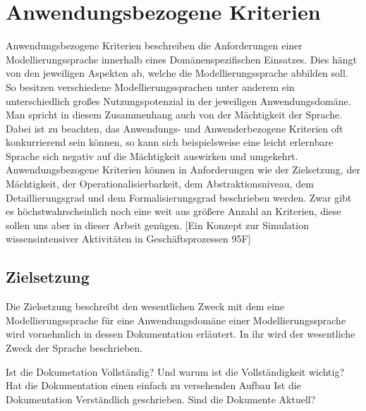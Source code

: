 \section{Anwendungsbezogene Kriterien}
\label{sc:AnwendungsbezogeneKriterien}
Anwendungsbezogene Kriterien beschreiben die Anforderungen einer Modellierungssprache innerhalb eines Domänenspezifischen Einsatzes.
Dies hängt von den jeweiligen Aspekten ab, welche die Modellierungssprache abbilden soll.
So besitzen verschiedene Modellierungssprachen unter anderem ein unterschiedlich großes Nutzungspotenzial in der jeweiligen Anwendungsdomäne.
Man spricht in diesem Zusammenhang auch von der Mächtigkeit der Sprache.
Dabei ist zu beachten, das Anwendungs- und Anwenderbezogene Kriterien oft konkurrierend sein können,
so kann sich beispielsweise eine leicht erlernbare Sprache sich negativ auf die Mächtigkeit auswirken und umgekehrt.
Anwendungsbezogene Kriterien können in Anforderungen wie der Zielsetzung, der Mächtigkeit, der Operationalisierbarkeit,
dem Abstraktionsniveau, dem Detaillierungsgrad und dem Formalisierungsgrad beschrieben werden.
Zwar gibt es höchstwahrscheinlich noch eine weit aus größere Anzahl an Kriterien, diese sollen uns aber in dieser Arbeit genügen.  
[Ein Konzept zur Simulation wissensintensiver Aktivitäten in Geschäftsprozessen 95F]

\subsection{Zielsetzung}
\label{ssc:Dokumentation}
Die Zielsetzung beschreibt den wesentlichen Zweck mit dem eine Modellierungssprache für eine Anwendungsdomäne einer Modellierungssprache wird vornehmlich in dessen Dokumentation erläutert. In ihr wird der wesentliche Zweck der Sprache beschrieben.

Ist die Dokumetation Vollständig? Und warum ist die Vollständigkeit wichtig?
Hat die Dokumentation einen einfach zu versehenden Aufbau
Ist die Dokumentation Verständlich geschrieben.
Sind die Dokumente Aktuell?

